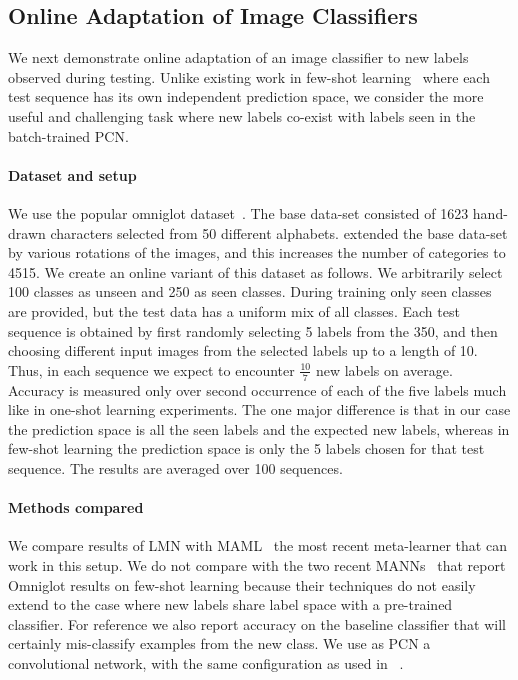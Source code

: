 \documentclass[letterpaper]{article} %
\begin{document}
\subsection{Online Adaptation of Image Classifiers}
\label{sec-expt-rare}
We next demonstrate online adaptation of an image classifier to new labels observed during testing.  Unlike existing work in few-shot learning~\cite{VinyalsBLKW16} where each test sequence has its own independent prediction space, we consider the more useful and challenging task where new labels co-exist with labels seen in the batch-trained PCN.

\paragraph*{Dataset and setup} We use the popular omniglot dataset~\cite{Lake1332}. The base data-set consisted of 1623 hand-drawn characters selected from 50 different alphabets.  \cite{VinyalsBLKW16} extended the base data-set by various rotations of the images, and this increases the number of categories to 4515.
We create an online variant of this dataset as follows. We arbitrarily select 100 classes as unseen and 250 as seen classes. During training only seen classes are provided, but the test data has a uniform mix of all classes. Each test sequence is obtained by first randomly selecting 5 labels from the 350, and then choosing different input images from the selected labels up to a length of 10.
Thus, in each sequence we expect to encounter $\frac{10}{7}$ new labels on average.   Accuracy is measured only over second occurrence of each of the five labels much like in one-shot learning experiments. The one major difference is that in our case the prediction space is all the seen labels and the expected new labels, whereas in few-shot learning the prediction space is only the 5 labels chosen for that test sequence. The results are averaged over 100 sequences.

\paragraph{Methods compared} We compare results of LMN with MAML~\cite{Finn2017ModelAgnosticMF} the most recent meta-learner that can work in this setup. We do not compare with the two recent MANNs~  that report Omniglot results on few-shot learning because their techniques do not easily extend to the case where new labels share label space with a pre-trained classifier. For reference we also report accuracy on the baseline classifier that will certainly mis-classify examples from the new class. We use as PCN a convolutional network, with the same configuration as used in ~.
\end{document}
